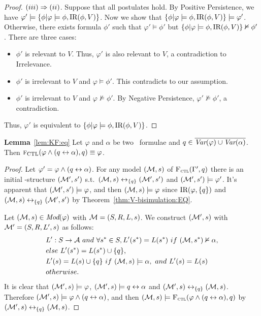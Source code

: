 \documentclass[letterpaper]{article} %
\begin{document}
\begin{proof}
$(iii)\Rightarrow (ii)$. Suppose that all postulates hold. By Positive Persistence, we have $\varphi' \models \{\phi | \varphi \models \phi, \textrm{IR}(\phi, V)\}$. Now
we show that $\{\phi | \varphi \models \phi, \textrm{IR}(\phi, V)\} \models \varphi'$. Otherwise, there exists formula $\phi'$ such that $\varphi' \models \phi'$ but $\{\phi | \varphi \models \phi, \textrm{IR}(\phi, V)\} \nvDash \phi'$. There are three cases:
\begin{itemize}
  \item $\phi'$ is relevant to $V$. Thus, $\varphi'$ is also relevant to $V$, a contradiction to Irrelevance.
  \item $\phi'$ is irrelevant to $V$ and $\varphi \models \phi'$. This contradicts to our assumption.
  \item $\phi'$ is irrelevant to $V$ and $\varphi \nvDash \phi'$. By Negative Persistence, $\varphi' \nvDash \phi'$, a contradiction.
\end{itemize}
Thus, $\varphi'$ is equivalent to $\{\phi | \varphi \models \phi, \textrm{IR}(\phi, V)\}$.
\end{proof}


 \noindent \textbf{Lemma}~\ref{lem:KF:eq} Let $\varphi$ and $\alpha$ be two \CTL\ formulae and $q\in
		\overline{\textit{Var}(\varphi) \cup \textit{Var}(\alpha)}$. Then
	${\textsc{f}_{\textrm{CTL}}}(\varphi \wedge (q\leftrightarrow\alpha), q)\equiv \varphi$.\\
    \begin{proof}
	Let $\varphi' =\varphi \wedge (q\leftrightarrow\alpha)$. For any model $({\cal M},s)$ of ${\textsc{F}_{\textsc{ctl}}}(\Gamma', q)$ there is an initial \MPK-structure $({\cal M}',s')$ s.t.\ $({\cal M},s)\leftrightarrow_{\{q\}}({\cal M}',s')$ and $({\cal M}',s') \models \varphi'$. It's apparent that $({\cal M}',s') \models \varphi$, and then $({\cal M},s) \models \varphi$ since $\textrm{IR}(\varphi,\{q\})$ and $({\cal M},s)\leftrightarrow_{\{q\}}({\cal M}',s')$
	by Theorem~\ref{thm:V-bisimulation:EQ}.

	Let $({\cal M},s) \in \textit{Mod}(\varphi)$ with ${\cal M}=(S, R, L,s)$. We construct $({\cal M}', s)$ with ${\cal M}' = (S, R, L',s)$ as follows:
    \begin{align*}
       & L':S \rto \Ha\ and\ \forall s^*\in S, L'(s^*) = L(s^*)\ if\ (\Hm, s^*) \nvDash \alpha,\\
       & else\ L'(s^*) = L(s^*)\cup\{q\}, \\
       & L'(s) = L(s) \cup\{q\}\ if\ (\Hm, s) \models \alpha,\ and\ L'(s) = L(s)\\
       & otherwise.
    \end{align*}
	It is clear that $({\cal M}',s) \models \varphi$, $({\cal M}',s) \models q\leftrightarrow \alpha$ and
	$({\cal M}', s) \leftrightarrow_{\{q\}} ({\cal M}, s)$. Therefore $({\cal M}', s) \models \varphi \wedge (q\leftrightarrow\alpha)$, and then $({\cal M}, s) \models {\textsc{F}_{\textsc{ctl}}} (\varphi \wedge (q\leftrightarrow\alpha), q)$ by
	$({\cal M}', s) \leftrightarrow_{\{q\}} ({\cal M}, s)$.
\end{proof}
\end{document}
